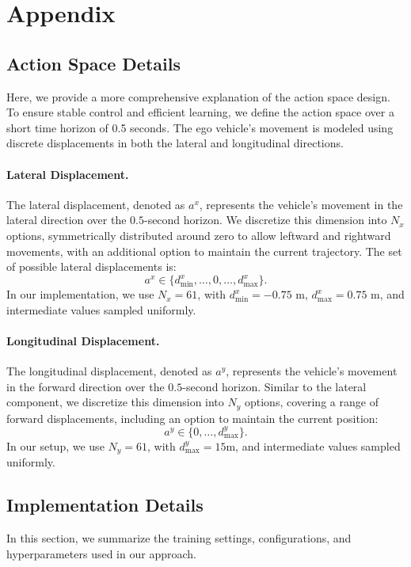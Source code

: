 \section{Appendix}
\label{appendix}

\subsection{Action Space Details}
Here, we provide a more comprehensive explanation of the action space design. To ensure stable control and efficient learning, we define the action space over a short time horizon of 0.5 seconds. The ego vehicle's movement is modeled using discrete displacements in both the lateral and longitudinal directions.

\paragraph{Lateral Displacement.} 
The lateral displacement, denoted as $a^x$, represents the vehicle's movement in the lateral direction over the $0.5$-second horizon. We discretize this dimension into $N_x$ options, symmetrically distributed around zero to allow leftward and rightward movements, with an additional option to maintain the current trajectory. The set of possible lateral displacements is:
\begin{equation}
    a^x \in \{d^x_{\text{min}}, \dots, 0, \dots, d^x_{\text{max}}\}.
\end{equation}
In our implementation, we use $N_x = 61$, with $d^x_{\text{min}} = -0.75$ m, $d^x_{\text{max}} = 0.75$ m, and intermediate values sampled uniformly.

\paragraph{Longitudinal Displacement.} 
The longitudinal displacement, denoted as $a^y$, represents the vehicle's movement in the forward direction over the $0.5$-second horizon. Similar to the lateral component, we discretize this dimension into $N_y$ options, covering a range of forward displacements, including an option to maintain the current position:
\begin{equation}
    a^y \in \{0, \dots, d^y_{\text{max}}\}.
\end{equation}
In our setup, we use $N_y = 61$, with $d^y_{\text{max}} = 15$m, and intermediate values sampled uniformly.


\subsection{Implementation Details}
In this section, we summarize the training settings, configurations, and hyperparameters used in our approach.

